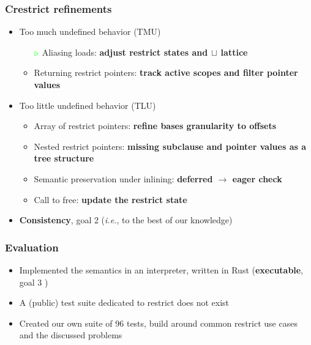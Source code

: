 \documentclass[aspectratio=169, c]{beamer}
\makeatletter
\def\ie{\textit{i.e.}\@\xspace}
\newcommand{\greentriangleright}[0]{\begingroup\color{green}\triangleright\endgroup}
\newcommand{\cmark}{\ding{51}}%
\makeatother
\begin{document}


\begin{frame}
\frametitle{Crestrict refinements}
\begin{itemize}
\item Too much undefined behavior (TMU)
    \begin{itemize}
        \item[$\greentriangleright$] Aliasing loads: \textbf{adjust restrict states and $\mathrel{\sqcup}$ lattice}
        \item Returning restrict pointers: \textbf{track active scopes and filter pointer values}
    \end{itemize}
\item Too little undefined behavior (TLU)
    \begin{itemize}
        \item Array of restrict pointers: \textbf{refine bases granularity to offsets}
        \item Nested restrict pointers: \textbf{missing subclause and pointer values as a tree structure}
        \item Semantic preservation under inlining: \textbf{deferred $\rightarrow$ eager check}
        \item Call to free: \textbf{update the restrict state}
    \end{itemize}
\end{itemize}

\begin{itemize}
    \item \textbf{Consistency}, goal 2 \cmark (\ie, to the best of our knowledge)
\end{itemize}

\end{frame}



\begin{frame}
\frametitle{Evaluation}
\begin{itemize}
    \item Implemented the semantics in an interpreter, written in Rust (\textbf{executable}, goal 3 \cmark)
    \item A (public) test suite dedicated to restrict does not exist
    \item Created our own suite of 96 tests, build around common restrict use cases and the discussed problems
\end{itemize}
\end{frame}
\end{document}
